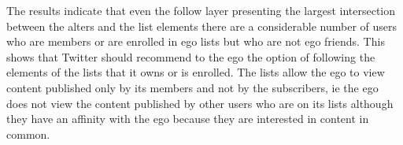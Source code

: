 The results indicate that even the follow layer presenting the largest intersection between the alters and the list elements there are a considerable number of users who are members or are enrolled in ego lists but who are not ego friends. This shows that Twitter should recommend to the ego the option of following the elements of the lists that it owns or is enrolled. The lists allow the ego to view content published only by its members and not by the subscribers, ie the ego does not view the content published by other users who are on its lists although they have an affinity with the ego because they are interested in content in common.

%



%
%
%
%
%

